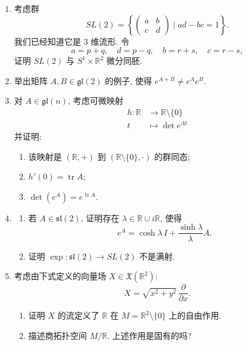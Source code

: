 \begin{RiemannExercise}
\begin{enumerate}[label=(\arabic*),ref=\arabic*,leftmargin=*]
\begin{enumerate}[label=(\alph*),leftmargin=*]
\[
  \begin{pmatrix}y&x\\0&1\end{pmatrix}
\]
组成的子群, 再验证你的结果.
\end{enumerate}
\item\label{ex:special-linear-two-diffeomorphism} 考虑群
\[
  SL(2)=\left\{\begin{pmatrix}a&b\\c&d\end{pmatrix}\mid ad-bc=1\right\}.
\]
我们已经知道它是 3 维流形. 令
\[
  a=p+q,\quad d=p-q,\quad b=r+s,\quad c=r-s,
\]
证明 $SL(2)$ 与 $S^1\times\mathbb{R}^2$ 微分同胚.
\item\label{ex:exponentials-of-noncommuting-matrices} 举出矩阵 $A,B\in\mathfrak{gl}(2)$ 的例子, 使得 $e^{A+B}\ne e^Ae^B$.
\item\label{ex:determinant-of-matrix-exponential} 对 $A\in\mathfrak{gl}(n)$, 考虑可微映射
\begin{align*}
  h:\mathbb{R}&\to\mathbb{R}\setminus\{0\}\\
  t&\mapsto\det e^{At}
\end{align*}
并证明:
\begin{enumerate}[label=(\alph*),leftmargin=*]
\item 该映射是 $(\mathbb{R},+)$ 到 $(\mathbb{R}\setminus\{0\},\cdot)$ 的群同态;
\item $h'(0)=\operatorname{tr}A$;
\item $\det(e^A)=e^{\operatorname{tr}A}$.
\end{enumerate}
\item\label{ex:non-surjective-special-linear-exponential}
\begin{enumerate}[label=(\alph*),leftmargin=*]
\item 若 $A\in\mathfrak{sl}(2)$, 证明存在 $\lambda\in\mathbb{R}\cup i\mathbb{R}$, 使得
\[
  e^A=\cosh\lambda\,I+\frac{\sinh\lambda}{\lambda}A.
\]
\item 证明 $\exp:\mathfrak{sl}(2)\to SL(2)$ 不是满射.
\end{enumerate}
\item\label{ex:free-action-on-punctured-plane} 考虑由下式定义的向量场 $X\in\mathfrak{X}(\mathbb{R}^2)$:
\[
  X=\sqrt{x^2+y^2}\,\frac{\partial}{\partial x}.
\]
\begin{enumerate}[label=(\alph*),leftmargin=*]
\item 证明 $X$ 的流定义了 $\mathbb{R}$ 在 $M=\mathbb{R}^2\setminus\{0\}$ 上的自由作用.
\item 描述商拓扑空间 $M/\mathbb{R}$. 上述作用是固有的吗?

\end{enumerate}
\end{enumerate}
\end{RiemannExercise}
